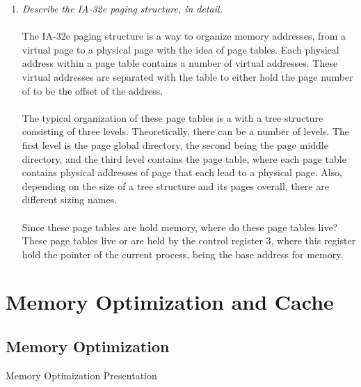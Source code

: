 \documentclass[letterpaper,10pt,onecolumn,compsoc]{IEEEtran}
\begin{document}
\begin{enumerate}
\bigskip
\item \textit{Describe the IA-32e paging structure, in detail.}
\\ ~ \\
The IA-32e paging structure is a way to organize memory addresses, from a virtual page to a physical page with the idea of page tables. Each physical address within a page table contains a number of virtual addresses. These virtual addresses are separated with the table to either hold the page number of to be the offset of the address.
\\ ~ \\
The typical organization of these page tables is a with a tree structure consisting of three levels. Theoretically, there can be a number of levels. The first level is the page global directory, the second being the page middle directory, and the third level contains the page table, where each page table contains physical addresses of page that each lead to a physical page. Also, depending on the size of a tree structure and its pages overall, there are different sizing names. 
\\ ~ \\ 
Since these page tables are hold memory, where do these page tables live? These page tables live or are held by the control register 3, where this register hold the pointer of the current process, being the base address for memory.

\end{enumerate}

\section{Memory Optimization and Cache}

\subsection{Memory Optimization}


Memory Optimization Presentation
\end{document}
